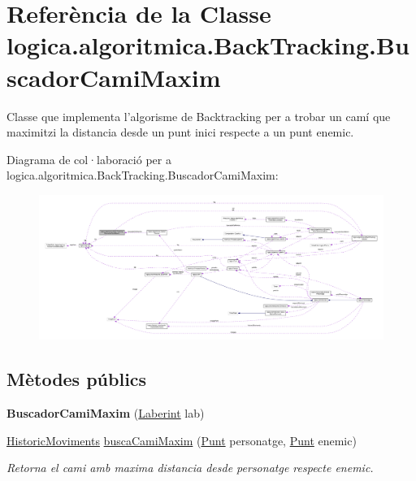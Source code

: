 \hypertarget{classlogica_1_1algoritmica_1_1_back_tracking_1_1_buscador_cami_maxim}{\section{Referència de la Classe logica.\+algoritmica.\+Back\+Tracking.\+Buscador\+Cami\+Maxim}
\label{classlogica_1_1algoritmica_1_1_back_tracking_1_1_buscador_cami_maxim}
}


Classe que implementa l'algorisme de Backtracking per a trobar un camí que maximitzi la distancia desde un punt inici respecte a un punt enemic.  




Diagrama de col·laboració per a logica.\+algoritmica.\+Back\+Tracking.\+Buscador\+Cami\+Maxim\+:
\nopagebreak
\begin{figure}[H]
\begin{center}
\leavevmode
\includegraphics[width=350pt]{classlogica_1_1algoritmica_1_1_back_tracking_1_1_buscador_cami_maxim__coll__graph}
\end{center}
\end{figure}
\subsection*{Mètodes públics}
\begin{DoxyCompactItemize}
\item 
\hypertarget{classlogica_1_1algoritmica_1_1_back_tracking_1_1_buscador_cami_maxim_a67aadbdebeeb60a4b5aab24c9a2e42e9}{{\bfseries Buscador\+Cami\+Maxim} (\hyperlink{classlogica_1_1laberints_1_1_laberint}{Laberint} lab)}\label{classlogica_1_1algoritmica_1_1_back_tracking_1_1_buscador_cami_maxim_a67aadbdebeeb60a4b5aab24c9a2e42e9}

\item 
\hyperlink{classlogica_1_1historic__moviments_1_1_historic_moviments}{Historic\+Moviments} \hyperlink{classlogica_1_1algoritmica_1_1_back_tracking_1_1_buscador_cami_maxim_afbd9364d6bdb5233798dde0d34090eec}{busca\+Cami\+Maxim} (\hyperlink{classlogica_1_1_punt}{Punt} personatge, \hyperlink{classlogica_1_1_punt}{Punt} enemic)
\begin{DoxyCompactList}\small\item\em Retorna el cami amb maxima distancia desde personatge respecte enemic. \end{DoxyCompactList}\end{DoxyCompactItemize}
